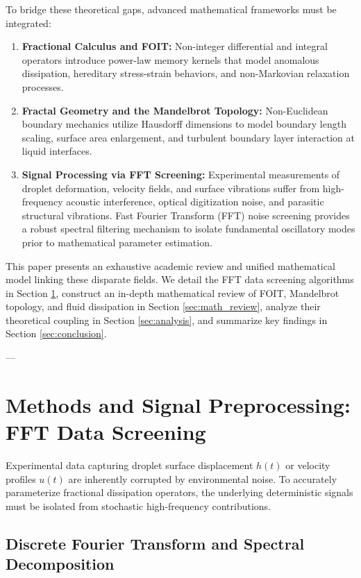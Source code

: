 \documentclass[11pt,a4paper]{article}
\begin{document}
To bridge these theoretical gaps, advanced mathematical frameworks must be integrated:
\begin{enumerate}
    \item \textbf{Fractional Calculus and FOIT:} Non-integer differential and integral operators introduce power-law memory kernels that model anomalous dissipation, hereditary stress-strain behaviors, and non-Markovian relaxation processes.
    \item \textbf{Fractal Geometry and the Mandelbrot Topology:} Non-Euclidean boundary mechanics utilize Hausdorff dimensions to model boundary length scaling, surface area enlargement, and turbulent boundary layer interaction at liquid interfaces.
    \item \textbf{Signal Processing via FFT Screening:} Experimental measurements of droplet deformation, velocity fields, and surface vibrations suffer from high-frequency acoustic interference, optical digitization noise, and parasitic structural vibrations. Fast Fourier Transform (FFT) noise screening provides a robust spectral filtering mechanism to isolate fundamental oscillatory modes prior to mathematical parameter estimation.
\end{enumerate}

This paper presents an exhaustive academic review and unified mathematical model linking these disparate fields. We detail the FFT data screening algorithms in Section \ref{sec:methods}, construct an in-depth mathematical review of FOIT, Mandelbrot topology, and fluid dissipation in Section \ref{sec:math_review}, analyze their theoretical coupling in Section \ref{sec:analysis}, and summarize key findings in Section \ref{sec:conclusion}.

---

\section{Methods and Signal Preprocessing: FFT Data Screening} \label{sec:methods}

Experimental data capturing droplet surface displacement $h(t)$ or velocity profiles $u(t)$ are inherently corrupted by environmental noise. To accurately parameterize fractional dissipation operators, the underlying deterministic signals must be isolated from stochastic high-frequency contributions.

\subsection{Discrete Fourier Transform and Spectral Decomposition}
\end{document}
